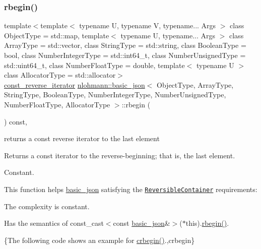 \subsubsection{\texorpdfstring{rbegin()}{rbegin()}\hspace{0.1cm}{\footnotesize\ttfamily [2/2]}}
{\footnotesize\ttfamily template$<$template$<$ typename U, typename V, typename... Args $>$ class Object\+Type = std\+::map, template$<$ typename U, typename... Args $>$ class Array\+Type = std\+::vector, class String\+Type  = std\+::string, class Boolean\+Type  = bool, class Number\+Integer\+Type  = std\+::int64\+\_\+t, class Number\+Unsigned\+Type  = std\+::uint64\+\_\+t, class Number\+Float\+Type  = double, template$<$ typename U $>$ class Allocator\+Type = std\+::allocator$>$ \\
\hyperlink{classnlohmann_1_1basic__json_ae336fff01f4b78e3e16e5008dc8dbc00}{const\+\_\+reverse\+\_\+iterator} \hyperlink{classnlohmann_1_1basic__json}{nlohmann\+::basic\+\_\+json}$<$ Object\+Type, Array\+Type, String\+Type, Boolean\+Type, Number\+Integer\+Type, Number\+Unsigned\+Type, Number\+Float\+Type, Allocator\+Type $>$\+::rbegin (\begin{DoxyParamCaption}{ }\end{DoxyParamCaption}) const\hspace{0.3cm}{\ttfamily [inline]}, {\ttfamily [noexcept]}}



returns a const reverse iterator to the last element 

Returns a const iterator to the reverse-\/beginning; that is, the last element.

  Constant.

This function helps {\ttfamily \hyperlink{classnlohmann_1_1basic__json}{basic\+\_\+json}} satisfying the \href{http://en.cppreference.com/w/cpp/concept/ReversibleContainer}{\tt Reversible\+Container} requirements\+:
\begin{DoxyItemize}
\item The complexity is constant.
\item Has the semantics of {\ttfamily const\+\_\+cast$<$const \hyperlink{classnlohmann_1_1basic__json}{basic\+\_\+json}\&$>$($\ast$this).\hyperlink{classnlohmann_1_1basic__json_a62ccf5b9b3674aec2403fbc02da03db8}{rbegin()}}.
\end{DoxyItemize}

\{The following code shows an example for {\ttfamily \hyperlink{classnlohmann_1_1basic__json_a060b33f8f255986088652625f9d50681}{crbegin()}}.,crbegin\}

